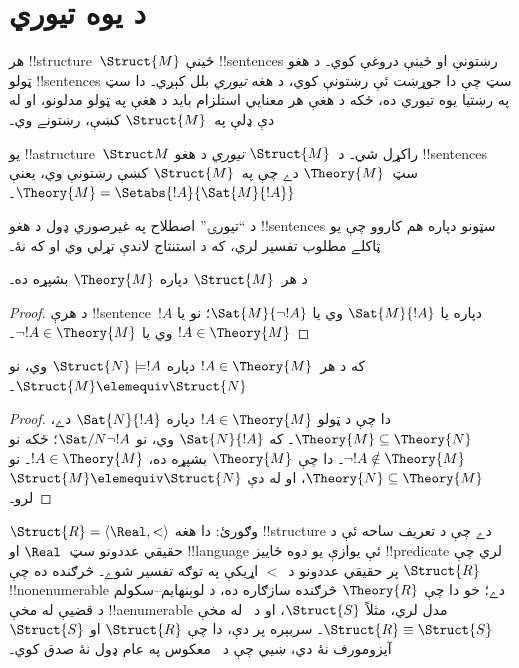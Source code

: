 \documentclass[../../../include/open-logic-section]{subfiles}
\begin{document}

\section{د يوه  تيوري}

هر !!{structure}~$\Struct{M}$ ځينې !!{sentence}s رښتونې او ځينې
دروغې کوي۔ د هغو ټولو !!{sentence}s سټ چې دا جوړښت ئې رښتونې کوي، د
هغه \emph{تيوري} بلل کېږي۔ دا سټ په رښتيا يوه تيوري ده، ځکه د هغې هر
معنايي استلزام بايد د هغې په ټولو مدلونو، او له دې ډلې
په~$\Struct{M}$ کښې، رښتونے وي۔

\begin{defn}
  يو !!a{structure}~$\Struct M$ راکړل شي۔ د~$\Struct{M}$
  \emph{تيوري} د هغو !!{sentence}s سټ~$\Theory{M}$ دے چې
  په~$\Struct{M}$ کښې رښتونې وي، يعنې
  $\Theory{M} = \Setabs{!A}{\Sat{M}{!A}}$۔
\end{defn}

د ``تيورۍ'' اصطلاح په غيرصوري ډول د هغو !!{sentence}s سټونو دپاره
هم کاروو چې يو ټاکلے مطلوب تفسير لري، که د استنتاج لاندې تړلي وي او
که نۀ۔

\begin{prop}
د هر~$\Struct{M}$ دپاره $\Theory{M}$ بشپړه ده۔
\end{prop}

\begin{proof}
د هرې !!{sentence}~$!A$ دپاره يا $\Sat{M}{!A}$ وي يا
$\Sat{M}{\lnot !A}$؛ نو يا $!A \in \Theory{M}$ وي يا
$\lnot !A \in \Theory{M}$۔
\end{proof}

\begin{prop}
  که د هر~$!A \in \Theory{M}$ دپاره $\Struct{N} \models !A$ وي، نو
  $\Struct{M} \elemequiv \Struct{N}$۔
\end{prop}

\begin{proof}
دا چې د ټولو $!A \in \Theory{M}$ دپاره $\Sat{N}{!A}$ دے،
$\Theory{M} \subseteq \Theory{N}$۔ که $\Sat{N}{!A}$ وي، نو
$\Sat/{N}{\lnot !A}$؛ ځکه نو $\lnot !A \notin \Theory{M}$۔ دا چې
$\Theory{M}$ بشپړه ده، $!A \in \Theory{M}$۔ نو
$\Theory{N} \subseteq \Theory{M}$، او له دې
$\Struct{M} \elemequiv \Struct{N}$ لرو۔
\end{proof}

\begin{rem}
  $\Struct{R} = \langle\Real, <\rangle$ وګورئ: دا هغه !!{structure}
  دے چې د تعريف ساحه ئې د حقيقي عددونو سټ~$\Real$ او !!{language} ئې
  يوازې يو دوه ځاييز !!{predicate} لري چې پر حقيقي عددونو د~$<$
  اړيکې په توګه تفسير شوے۔ څرګنده ده چې $\Struct{R}$
  !!{nonenumerable} دے؛ خو دا چې $\Theory{R}$ څرګنده سازګاره ده، د
  لوېنهايم--سکولم د قضيې له مخې !!a{enumerable} مدل لري، مثلاً
  $\Struct{S}$، او د~ له مخې $\Struct{R}
  \equiv \Struct{S}$۔ سربېره پر دې، دا چې $\Struct{R}$ او
  $\Struct{S}$ آيزومورف نۀ دي، ښيي چې د~ معکوس
  په عام ډول نۀ صدق کوي۔
\end{rem}
\end{document}
